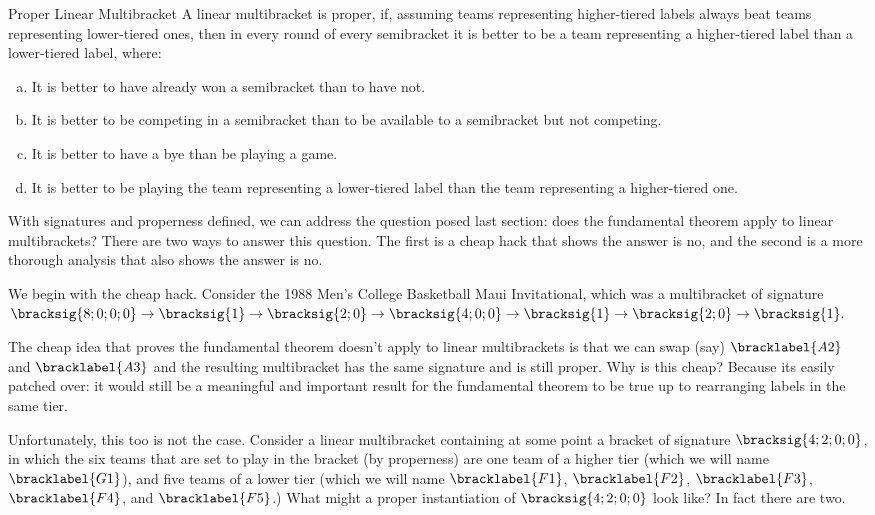{    \begin{definition}{Proper Linear Multibracket}{}
        A linear multibracket is proper, if, assuming teams representing higher-tiered labels always beat teams representing lower-tiered ones, then in every round of every semibracket it is better to be a team representing a higher-tiered label than a lower-tiered label, where:
        \begin{enumerate}[(a)]
            \item It is better to have already won a semibracket than to have not.
            \item It is better to be competing in a semibracket than to be available to a semibracket but not competing.
            \item It is better to have a bye than be playing a game.
            \item It is better to be playing the team representing a lower-tiered label than the team representing a higher-tiered one.
        \end{enumerate}
    \end{definition}

    With signatures and properness defined, we can address the question posed last section: does the fundamental theorem apply to linear multibrackets? There are two ways to answer this question. The first is a cheap hack that shows the answer is no, and the second is a more thorough analysis that also shows the answer is no.

    We begin with the cheap hack. Consider the 1988 Men's College Basketball Maui Invitational, which was a multibracket of signature $\bracksig{8;0;0;0} \to \bracksig{1} \to \bracksig{2;0} \to \bracksig{4;0;0} \to \bracksig{1} \to \bracksig{2;0} \to \bracksig{1}.$


    The cheap idea that proves the fundamental theorem doesn't apply to linear multibrackets is that we can swap (say) $\bracklabel{A2}$ and $\bracklabel{A3}$ and the resulting multibracket has the same signature and is still proper. Why is this cheap? Because its easily patched over: it would still be a meaningful and important result for the fundamental theorem to be true up to rearranging labels in the same tier.

    Unfortunately, this too is not the case. Consider a linear multibracket containing at some point a bracket of signature $\bracksig{4;2;0;0}$, in which the six teams that are set to play in the bracket (by properness) are one team of a higher tier (which we will name $\bracklabel{G1}$), and five teams of a lower tier (which we will name $\bracklabel{F1}$, $\bracklabel{F2}$, $\bracklabel{F3}$, $\bracklabel{F4}$, and $\bracklabel{F5}$.) What might a proper instantiation of $\bracksig{4;2;0;0}$ look like? In fact there are two.

}
